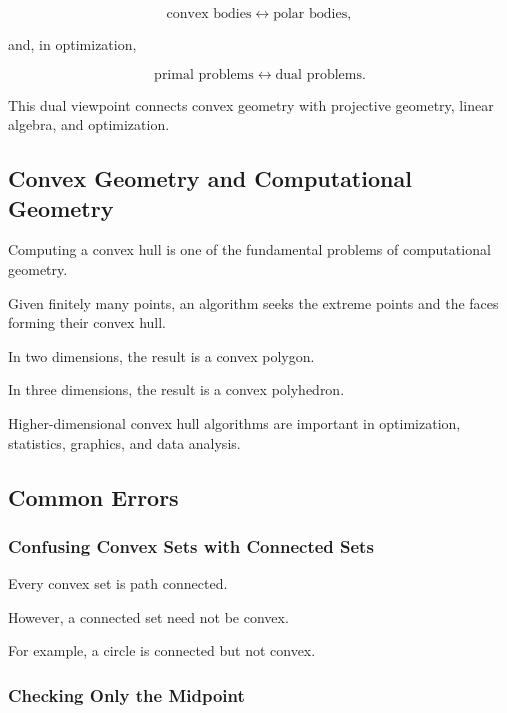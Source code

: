 \[
\boxed{
\text{convex bodies}
\longleftrightarrow
\text{polar bodies},
}
\]

and, in optimization,

\[
\boxed{
\text{primal problems}
\longleftrightarrow
\text{dual problems}.
}
\]

This dual viewpoint connects convex geometry with projective geometry,
linear algebra, and optimization.

\subsection{Convex Geometry and Computational Geometry}
\label{subsec:convex-computational-geometry}

Computing a convex hull is one of the fundamental problems of computational
geometry.

Given finitely many points, an algorithm seeks the extreme points and the
faces forming their convex hull.

In two dimensions, the result is a convex polygon.

In three dimensions, the result is a convex polyhedron.

Higher-dimensional convex hull algorithms are important in optimization,
statistics, graphics, and data analysis.

\subsection{Common Errors}
\label{subsec:convex-geometry-common-errors}

\subsubsection{Confusing Convex Sets with Connected Sets}

Every convex set is path connected.

However, a connected set need not be convex.

For example, a circle is connected but not convex.

\subsubsection{Checking Only the Midpoint}

